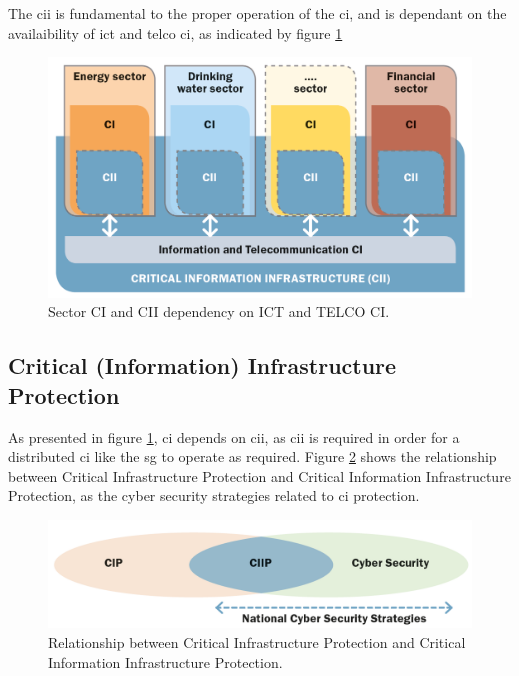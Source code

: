 The \acrshort{cii} is fundamental to the proper operation of the \acrshort{ci}, and is dependant on the availaibility of \acrfull{ict} and \acrfull{telco} \acrlong{ci}, as 
indicated by figure \ref{fig:CI-CIII}


\begin{figure}[ht]
\includegraphics[width=\linewidth]{figures/CI-CII.png}
\caption[CI/CIII in the ICT and TELCO sectors]{Sector CI and CII dependency on ICT and TELCO CI. \cite{luiijf2016gfce}}
\label{fig:CI-CIII}
\end{figure}


\subsection{Critical (Information) Infrastructure Protection}

As presented in figure \ref{fig:CI-CIII}, \acrfull{ci} depends on \acrfull{cii}, as \acrshort{cii} is required in order for a distributed \acrshort{ci} like the \acrshort{sg} to operate as required. Figure \ref{fig:CI-CIII-Security} shows the relationship between Critical Infrastructure Protection and Critical Information Infrastructure Protection, as the cyber security strategies related to \acrshort{ci} protection.


\begin{figure}[ht]
\includegraphics[width=\linewidth]{figures/CIP-CIIP-Security.png}
\caption[CIP-CIIP relations]{Relationship between Critical Infrastructure Protection and Critical Information Infrastructure Protection. \cite{luiijf2016gfce}}
\label{fig:CI-CIII-Security}
\end{figure}

